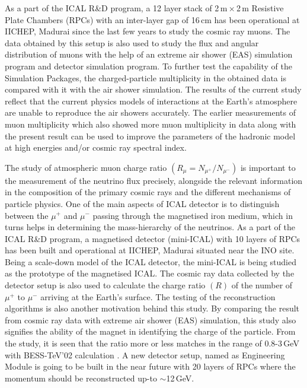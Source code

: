 As a part of the ICAL R\&D program, a 12 layer stack of
2\,m\,$\times$\,2\,m Resistive Plate Chambers (RPCs) with an
inter-layer gap of 16\,cm has been operational at IICHEP, Madurai
since the last few years to study the cosmic ray muons. The data
obtained by this setup is also used to study the flux and angular
distribution of muons with the help of an extreme air shower (EAS)
simulation program and detector simulation program. To further
test the capability of the Simulation Packages, the charged-particle
multiplicity in the obtained data is compared with it with the air
shower simulation.
The results of the current study reflect that the current physics
models of interactions at the Earth's atmosphere are unable to
reproduce the air showers accurately. The earlier measurements of muon
multiplicity which also showed more muon
multiplicity in data along with the present result can be used to
improve the parameters of the hadronic model at high energies and/or
cosmic ray spectral index.

The study of atmospheric muon charge ratio
$\left(R_{\mu}=N_{\mu^{+}}/N_{\mu^{-}}\right)$
is important to the measurement of the neutrino flux precisely,
alongside the relevant information in the composition of the primary
cosmic rays and the different mechanisms of particle physics.
One of the main aspects of ICAL detector is to distinguish between
the $\mu^{+}$ and $\mu^{-}$ passing through the magnetised iron
medium, which in turns helps in determining the mass-hierarchy of
the neutrinos.
As a part of the ICAL R\&D program, a magnetised detector (mini-ICAL)
with 10 layers of RPCs has been built and operational at IICHEP,
Madurai situated near the INO site. Being a scale-down model of the
ICAL detector, the mini-ICAL is being studied as the prototype of
the magnetised ICAL.
The cosmic ray data collected by the
detector setup is also used to calculate the charge ratio $(R)$
of the number of $\mu^{+}$ to $\mu^{-}$ arriving at the Earth's surface.
The testing of the reconstruction algorithms is also another
motivation behind this study.
By comparing the result from cosmic ray data with extreme
air shower (EAS) simulation, this study also signifies the ability of
the magnet in identifying the charge of the particle.
From the study, it is seen that the ratio more or less matches
in the range of 0.8-3\,GeV with
BESS-TeV'02 calculation \cite{bess2002}.
A new detector setup, named as Engineering Module is going to be
built in the near future with 20 layers of RPCs where the momentum
should be reconstructed up-to $\sim$12\,GeV.
